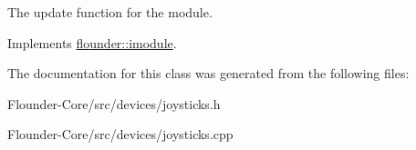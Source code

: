 The update function for the module. 



Implements \hyperlink{classflounder_1_1imodule_a9a53d48a46b5f6b16a92b2cd8503f74a}{flounder\+::imodule}.



The documentation for this class was generated from the following files\+:\begin{DoxyCompactItemize}
\item 
Flounder-\/\+Core/src/devices/joysticks.\+h\item 
Flounder-\/\+Core/src/devices/joysticks.\+cpp\end{DoxyCompactItemize}
